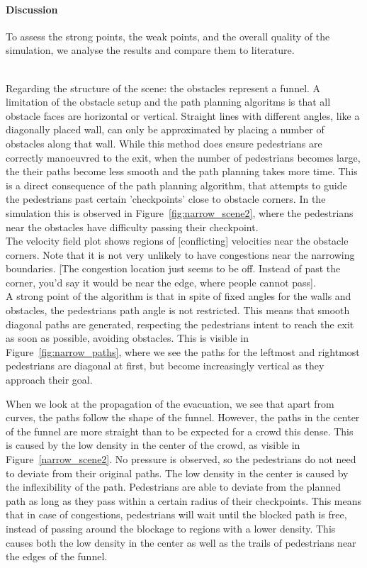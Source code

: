 \documentclass{article}
\begin{document}
\paragraph{Discussion}
To assess the strong points, the weak points, and the overall quality of the simulation, we analyse the results and compare them to literature.

\ \\
Regarding the structure of the scene: the obstacles represent a funnel. A limitation of the obstacle setup and the path planning algoritms is that all obstacle faces are horizontal or vertical. 
Straight lines with different angles, like a diagonally placed wall, can only be approximated by placing a number of obstacles along that wall. 
While this method does ensure pedestrians are correctly manoeuvred to the exit, when the number of pedestrians becomes large, the their paths become less smooth and the path planning takes more time. This is a direct consequence of the path planning algorithm, that attempts to guide the pedestrians past certain 'checkpoints' close to obstacle corners.
In the simulation this is observed in Figure~\ref{fig:narrow_scene2}, where the pedestrians near the obstacles have difficulty passing their checkpoint.\\
The velocity field plot shows regions of [conflicting] velocities near the obstacle corners.
Note that it is not very unlikely to have congestions near the narrowing boundaries. [The congestion location just seems to be off. Instead of past the corner, you'd say it would be near the edge, where people cannot pass].
\ \\
A strong point of the algorithm is that in spite of fixed angles for the walls and obstacles, the pedestrians path angle is not restricted. This means that smooth diagonal paths are generated, respecting the pedestrians intent to reach the exit as soon as possible, avoiding obstacles. This is visible in Figure~\ref{fig:narrow_paths}, where we see the paths for the leftmost and rightmost pedestrians are diagonal at first, but become increasingly vertical as they approach their goal.

When we look at the propagation of the evacuation, we see that apart from curves, the paths follow the shape of the funnel. However, the paths in the center of the funnel are more straight than to be expected for a crowd this dense. This is caused by the low density in the center of the crowd, as visible in Figure~\ref{narrow_scene2}. No pressure is observed, so the pedestrians do not need to deviate from their original paths.
The low density in the center is caused by the inflexibility of the path. Pedestrians are able to deviate from the planned path as long as they pass within a certain radius of their checkpoints.
This means that in case of congestions, pedestrians will wait until the blocked path is free, instead of passing around the blockage to regions with a lower density. This causes both the low density in the center as well as the trails of pedestrians near the edges of the funnel.
\end{document}
